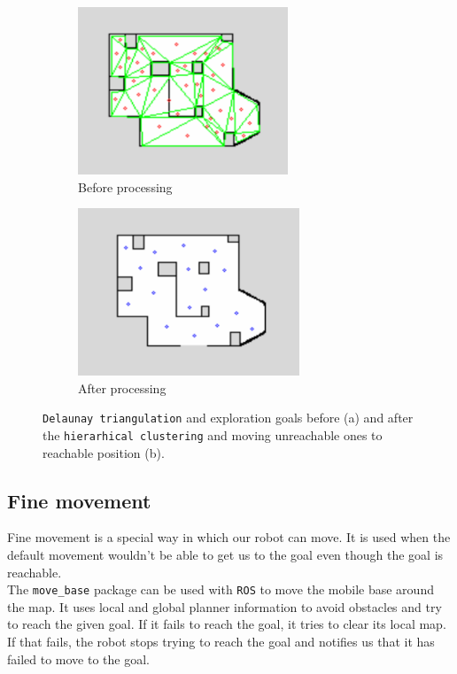 \documentclass[12pt,a4paper]{article}
\begin{document}
	\begin{figure}[h]
		\begin{subfigure}{.5\textwidth}
			\centering
			\includegraphics[height=5cm]{images/before}
			\caption{Before processing}
			\label{fig:before_clustering}
		\end{subfigure}
		\begin{subfigure}{.5\textwidth}
			\centering
			\includegraphics[height=5cm]{images/after}
			\caption{After processing}
			\label{fig:after_clustering}
		\end{subfigure}
		\caption{\texttt{Delaunay triangulation} and exploration goals before (a) and after the \texttt{hierarhical clustering} and moving unreachable ones to reachable position (b).}
		\label{fig:exploration_goals}
	\end{figure}
	
	\subsection{Fine movement} \label{fine_movement}
	Fine movement is a special way in which our robot can move. It is used when the default movement wouldn't be able to get us to the goal even though the goal is reachable.  \\

	The \texttt{move\_base} package can be used with \texttt{ROS} to move the mobile base around the map. It uses local and global planner information to avoid obstacles and try to reach the given goal. If it fails to reach the goal, it tries to clear its local map. If that fails, the robot stops trying to reach the goal and notifies us that it has failed to move to the goal. \\
	
\end{document}
